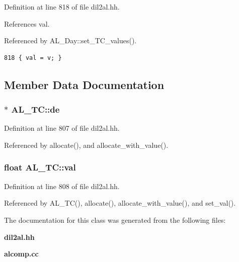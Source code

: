 Definition at line 818 of file dil2al.hh.

References val.

Referenced by AL\_\-Day::set\_\-TC\_\-values().



\footnotesize\begin{verbatim}818 { val = v; }
\end{verbatim}\normalsize 


\subsection{Member Data Documentation}
\subsubsection{$\ast$ AL\_\-TC::de\hspace{0.3cm}{\tt  [protected]}}\label{classAL__TC_n0}




Definition at line 807 of file dil2al.hh.

Referenced by allocate(), and allocate\_\-with\_\-value().
\subsubsection{\setlength{\rightskip}{0pt plus 5cm}float AL\_\-TC::val\hspace{0.3cm}{\tt  [protected]}}\label{classAL__TC_n1}




Definition at line 808 of file dil2al.hh.

Referenced by AL\_\-TC(), allocate(), allocate\_\-with\_\-value(), and set\_\-val().

The documentation for this class was generated from the following files:\begin{CompactItemize}
\item 
{\bf dil2al.hh}\item 
{\bf alcomp.cc}\end{CompactItemize}
